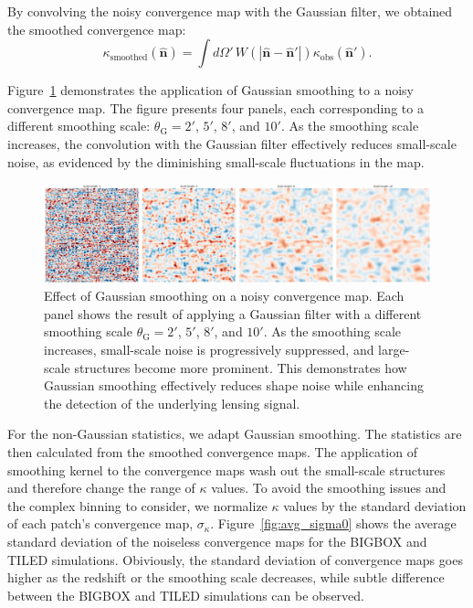 By convolving the noisy convergence map with the Gaussian filter, we obtained the smoothed convergence map:
\begin{equation}
    \kappa_{\mathrm{smoothed}}(\hat{\mathbf{n}}) = \int d\Omega' \, W(|\hat{\mathbf{n}} - \hat{\mathbf{n}}'|) \kappa_{\mathrm{obs}}(\hat{\mathbf{n}}').
\end{equation}

Figure~\ref{fig:smoothing} demonstrates the application of Gaussian smoothing to a noisy convergence map. The figure presents four panels, each corresponding to a different smoothing scale: $\theta_{\mathrm{G}} = 2'$, $5'$, $8'$, and $10'$. As the smoothing scale increases, the convolution with the Gaussian filter effectively reduces small-scale noise, as evidenced by the diminishing small-scale fluctuations in the map. 
\begin{figure}[ht]
    \centering
    \includegraphics[width=\textwidth]{figures/smoothed_comparison.png}
    \caption[Gaussian smoothing on a noisy convergence map for multiple smoothing scales]{Effect of Gaussian smoothing on a noisy convergence map. Each panel shows the result of applying a Gaussian filter with a different smoothing scale $\theta_{\mathrm{G}} = 2'$, $5'$, $8'$, and $10'$. As the smoothing scale increases, small-scale noise is progressively suppressed, and large-scale structures become more prominent. This demonstrates how Gaussian smoothing effectively reduces shape noise while enhancing the detection of the underlying lensing signal.}
\label{fig:smoothing}
\end{figure}

For the non-Gaussian statistics, we adapt Gaussian smoothing. The statistics are then calculated from the smoothed convergence maps. The application of smoothing kernel to the convergence maps wash out the small-scale structures and therefore change the range of $\kappa$ values. To avoid the smoothing issues and the complex binning to consider, we normalize $\kappa$ values by the standard deviation of each patch's convergence map, $\sigma_{\kappa}$. Figure~\ref{fig:avg_sigma0} shows the average standard deviation of the noiseless convergence maps for the BIGBOX and TILED simulations. Obiviously, the standard deviation of convergence maps goes higher as the redshift or the smoothing scale decreases, while subtle difference between the BIGBOX and TILED simulations can be observed.

